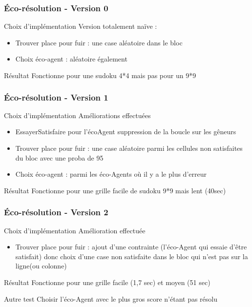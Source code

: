 \begin{frame}
    \frametitle{Éco-résolution - Version 0}
    \begin{block}{Choix d'implémentation}
    		Version totalement naïve :
    		\begin{itemize}
    			\item Trouver place pour fuir : une case aléatoire dans le bloc
    			\item Choix éco-agent : aléatoire également
    		\end{itemize}
    \end{block}
    \pause
    \begin{alertblock}{Résultat}
    		Fonctionne pour une sudoku 4*4 mais pas pour un 9*9
    \end{alertblock}
\end{frame}


\begin{frame}
    \frametitle{Éco-résolution - Version 1}
    \begin{block}{Choix d'implémentation}
    		Améliorations effectuées
    		\begin{itemize}
    			\item EssayerSatisfaire pour l'écoAgent suppression de la boucle sur les gêneurs
    			\item Trouver place pour fuir : une case aléatoire parmi les cellules non satisfaites du bloc avec une proba de 95%
    			\item Choix éco-agent : parmi les éco-Agents où il y a le plus d'erreur 
    		\end{itemize}
    \end{block}
    \pause
    \begin{alertblock}{Résultat}
    		Fonctionne pour une grille facile de sudoku 9*9 mais lent (40sec)
    \end{alertblock}
\end{frame}

\begin{frame}
    \frametitle{Éco-résolution - Version 2}
    \begin{block}{Choix d'implémentation}
    		Amélioration effectuée
    		\begin{itemize}
    			\item Trouver place pour fuir : ajout d'une contrainte (l'éco-Agent qui essaie d'être satisfait) donc choix d'une case non satisfaite dans le bloc qui n'est pas sur la ligne(ou colonne)
    		\end{itemize}
    \end{block}
    \pause
    \begin{alertblock}{Résultat}
    		Fonctionne pour une grille facile (1,7 sec) et moyen (51 sec)
    \end{alertblock}
    \pause
    \begin{exampleblock}{Autre test}
		Choisir l'éco-Agent avec le plus gros score n'étant pas résolu
	\end{exampleblock}
\end{frame}


